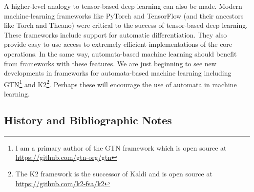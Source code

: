 \documentclass[main.tex]{subfiles}
\begin{document}
A higher-level analogy to tensor-based deep learning can also be made. Modern
machine-learning frameworks like PyTorch and TensorFlow (and their ancestors
like Torch and Theano) were critical to the success of tensor-based deep
learning. These frameworks include support for automatic differentiation. They
also provide easy to use access to extremely efficient implementations of the
core operations. In the same way, automata-based machine learning should
benefit from frameworks with these features. We are just beginning to see new
developments in frameworks for automata-based machine learning including
GTN\footnote{I am a primary author of the GTN framework which is open source at
\url{https://github.com/gtn-org/gtn}} and K2\footnote{The K2 framework is the
successor of Kaldi and is open source at \url{https://github.com/k2-fsa/k2}}.
Perhaps these will encourage the use of automata in machine learning.

\subsection{History and Bibliographic Notes}



\end{document}
